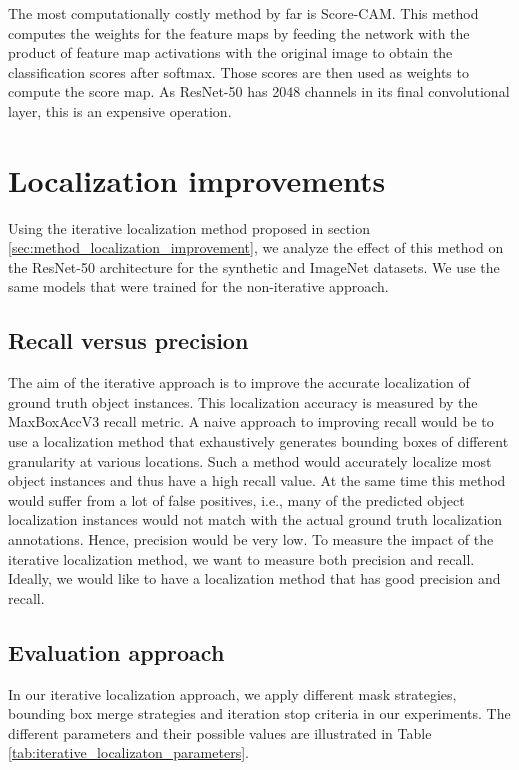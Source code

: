 The most computationally costly method by far is Score-CAM. This method computes the weights for the feature maps by feeding the network with the product of feature map activations with the original image to obtain the classification scores after softmax. Those scores are then used as weights to compute the score map. As ResNet-50 has 2048 channels in its final convolutional layer, this is an expensive operation.

\section{Localization improvements} \label{sec:exp_loc_improvements}

Using the iterative localization method proposed in section \ref{sec:method_localization_improvement}, we analyze the effect of this method on the ResNet-50 architecture for the synthetic and ImageNet datasets. We use the same models that were trained for the non-iterative approach.

\subsection{Recall versus precision}
The aim of the iterative approach is to improve the accurate localization of ground truth object instances. This localization accuracy is measured by the MaxBoxAccV3 recall metric. A naive approach to improving recall would be to use a localization method that exhaustively generates bounding boxes of different granularity at various locations. Such a method would accurately localize most object instances and thus have a high recall value. At the same time this method would suffer from a lot of false positives, i.e., many of the predicted object localization instances would not match with the actual ground truth localization annotations. Hence, precision would be very low. To measure the impact of the iterative localization method, we want to measure both precision and recall. Ideally, we would like to have a localization method that has good precision and recall.

\subsection{Evaluation approach}
In our iterative localization approach, we apply different mask strategies, bounding box merge strategies and iteration stop criteria in our experiments. The different parameters and their possible values are illustrated in Table \ref{tab:iterative_localizaton_parameters}.

